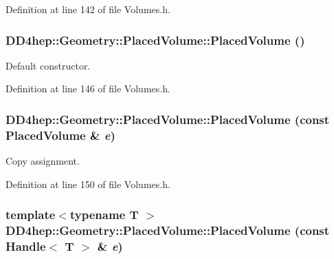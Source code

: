 Definition at line 142 of file Volumes.h.\hypertarget{class_d_d4hep_1_1_geometry_1_1_placed_volume_aa8ea9d912c9b81e33801502cafd513fb}{
\subsubsection[{PlacedVolume}]{\setlength{\rightskip}{0pt plus 5cm}DD4hep::Geometry::PlacedVolume::PlacedVolume ()}}
\label{class_d_d4hep_1_1_geometry_1_1_placed_volume_aa8ea9d912c9b81e33801502cafd513fb}


Default constructor. 

Definition at line 146 of file Volumes.h.\hypertarget{class_d_d4hep_1_1_geometry_1_1_placed_volume_a1cd5673caae2e9568ea34c5076ba306b}{
\subsubsection[{PlacedVolume}]{\setlength{\rightskip}{0pt plus 5cm}DD4hep::Geometry::PlacedVolume::PlacedVolume (const {\bf PlacedVolume} \& {\em e})}}
\label{class_d_d4hep_1_1_geometry_1_1_placed_volume_a1cd5673caae2e9568ea34c5076ba306b}


Copy assignment. 

Definition at line 150 of file Volumes.h.\hypertarget{class_d_d4hep_1_1_geometry_1_1_placed_volume_af048daea3d74193f73748eb982ce68cd}{
\subsubsection[{PlacedVolume}]{\setlength{\rightskip}{0pt plus 5cm}template$<$typename T $>$ DD4hep::Geometry::PlacedVolume::PlacedVolume (const {\bf Handle}$<$ {\bf T} $>$ \& {\em e})}}
\label{class_d_d4hep_1_1_geometry_1_1_placed_volume_af048daea3d74193f73748eb982ce68cd}


